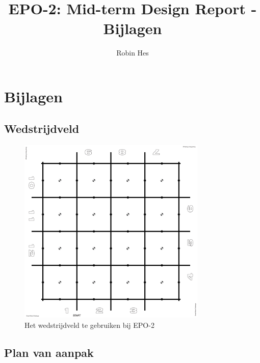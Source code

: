 \documentclass{report}
\title{EPO-2: Mid-term Design Report - Bijlagen}
\author{Robin Hes}
\begin{document}
\chapter{Bijlagen}
\label{ch:bijlagen}

\section{Wedstrijdveld}
\label{sec:field}

\begin{figure}[H]
	\centering
	\includegraphics[width=0.8\textwidth]{competitionField2440x2440-rc.pdf}
	\caption{Het wedstrijdveld te gebruiken bij EPO-2}
	\label{fig:field}
\end{figure}

\newpage
\section{Plan van aanpak}
\label{sec:pva}


\end{document}

